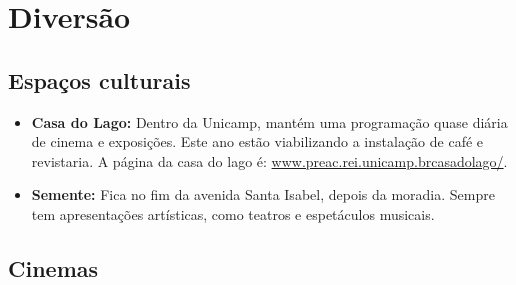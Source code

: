 
\section{Diversão}
\subsection{Espaços culturais}


\begin{itemize}
\item  \textbf{Casa do Lago:} Dentro da Unicamp, mantém uma programação quase diária de cinema e exposições. Este ano estão viabilizando a instalação de café e revistaria. A página da casa do lago é: \url{www.preac.rei.unicamp.brcasadolago/}.

\item  \textbf{Semente:} Fica no fim da avenida Santa Isabel, depois da moradia. Sempre tem apresentações artísticas, como teatros e espetáculos musicais.
\end{itemize}

\subsection{Cinemas}

